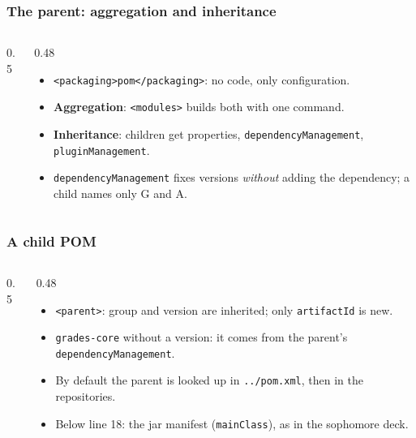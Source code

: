 \documentclass[aspectratio=169,10pt,compress]{beamer}
\begin{document}
\begin{frame}[t,fragile] \frametitle{The parent: aggregation and inheritance}
  \begin{columns}[T]
    \begin{column}{0.5\textwidth}
    \end{column}
    \begin{column}{0.48\textwidth}
      \begin{itemize}\small
        \item \texttt{<packaging>pom</packaging>}: no code, only configuration.
        \item \textbf{Aggregation}: \texttt{<modules>} builds both with one command.
        \item \textbf{Inheritance}: children get properties, \texttt{dependencyManagement}, \texttt{pluginManagement}.
        \item \texttt{dependencyManagement} fixes versions \emph{without} adding the dependency; a child names only G and A.
      \end{itemize}
    \end{column}
  \end{columns}
\end{frame}




\begin{frame}[t,fragile] \frametitle{A child POM}
  \begin{columns}[T]
    \begin{column}{0.5\textwidth}
    \end{column}
    \begin{column}{0.48\textwidth}
      \begin{itemize}\small
        \item \texttt{<parent>}: group and version are inherited; only \texttt{artifactId} is new.
        \item \texttt{grades-core} without a version: it comes from the parent's \texttt{dependencyManagement}.
        \item By default the parent is looked up in \texttt{../pom.xml}, then in the repositories.
        \item Below line 18: the jar manifest (\texttt{mainClass}), as in the sophomore deck.
      \end{itemize}
    \end{column}
  \end{columns}
\end{frame}
\end{document}
